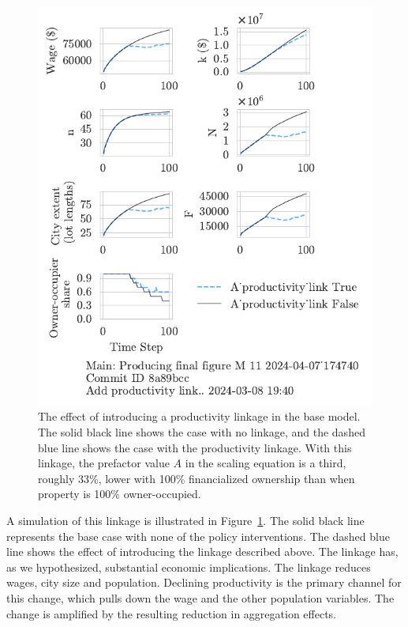 \begin{figure}[h!tb] 
\centering
\includegraphics[scale=1, trim={0 1.4cm .0cm 0},clip]{fig/productivity_link_174740.pdf} 
\caption[Productivity linkage in the base model]{The effect of introducing a productivity linkage in the base model. The solid black line shows the case with no linkage, and the dashed blue line shows the case with the productivity linkage. With this linkage, the prefactor value $A$ in the scaling equation is a third, roughly 33\%, lower with 100\% financialized ownership than when property is 100\% owner-occupied. }
\label{fig-impact-channel-example}
\end{figure}

A simulation of this linkage is illustrated in Figure~\ref{fig-impact-channel-example}. The solid black line represents the base case with none of the policy interventions. The dashed blue line shows the effect of introducing the linkage described above. 
The linkage has, as we hypothesized, substantial economic implications. The linkage reduces wages, city size and population.  Declining productivity is the primary channel for this change, which pulls down the wage and the other population variables. The change is amplified by the resulting reduction in aggregation effects. 

